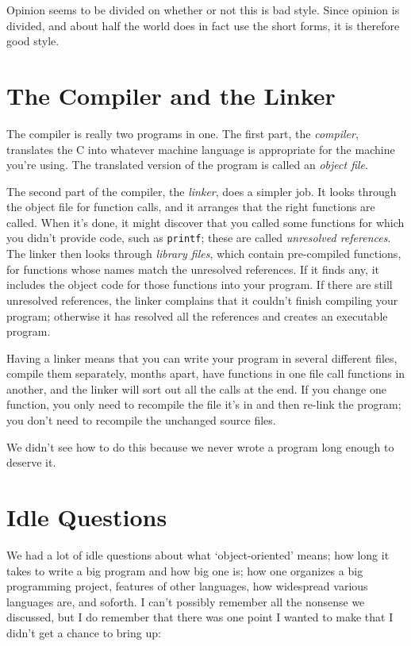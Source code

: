 Opinion seems to be divided on whether or not this is bad style.  Since
opinion is divided, and about half the world does in fact use the short
forms, it is therefore good style.

\section{The Compiler and the Linker}

The compiler is really two programs in one.  The first part, the {\em
compiler}\/, translates the C into whatever machine language is
appropriate for the machine you're using.  The translated version of the
program is called an {\em object file}\/. 

The second part of the compiler, the {\em linker}\/, does a simpler job.
It looks through the object file for function calls, and it arranges
that the right functions are called.  When it's done, it might discover
that you called some functions for which you didn't provide code, such
as {\tt printf}; these are called {\em unresolved references}\/.  The
linker then looks through {\em library files}\/, which contain
pre-compiled functions, for functions whose names match the unresolved
references.  If it finds any, it includes the object code for those
functions into your program.  If there are still unresolved references,
the linker complains that it couldn't finish compiling your program;
otherwise it has resolved all the references and creates an executable
program.

Having a linker means that you can write your program in several
different files, compile them separately, months apart, have functions
in one file call functions in another, and the linker will sort out all
the calls at the end. If you change one function, you only need to
recompile the file it's in and then re-link the program; you don't need
to recompile the unchanged source files.  

We didn't see how to do this because we never wrote a program long
enough to deserve it.

\section{Idle Questions}

We had a lot of idle questions about what `object-oriented' means;
how long it takes to write a big program and how big one is; how one
organizes a big programming project, features of other languages, how
widespread various languages are, and soforth.  I can't possibly
remember all the nonsense we discussed, but I do remember that there was
one point I wanted to make that I didn't get a chance to bring up:


